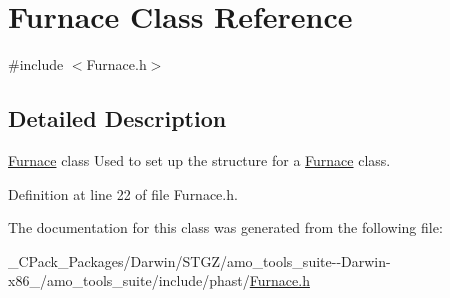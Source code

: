 \hypertarget{class_furnace}{}\section{Furnace Class Reference}
\label{class_furnace}


{\ttfamily \#include $<$Furnace.\+h$>$}



\subsection{Detailed Description}
\hyperlink{class_furnace}{Furnace} class Used to set up the structure for a \hyperlink{class_furnace}{Furnace} class. 

Definition at line 22 of file Furnace.\+h.



The documentation for this class was generated from the following file\+:\begin{DoxyCompactItemize}
\item 
\+\_\+\+C\+Pack\+\_\+\+Packages/\+Darwin/\+S\+T\+G\+Z/amo\+\_\+tools\+\_\+suite-\/-\/\+Darwin-\/x86\+\_/amo\+\_\+tools\+\_\+suite/include/phast/\hyperlink{___c_pack___packages_2_darwin_2_s_t_g_z_2amo__tools__suite--_darwin-x86__64_2amo__tools__suite_2include_2phast_2_furnace_8h}{Furnace.\+h}\end{DoxyCompactItemize}

